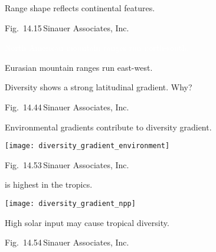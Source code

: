\documentclass[t]{beamer}
\begin{document}
%
{
\begin{frame}[t]{Range shape reflects continental features.}

	\vfilll

	\tiny \hfill Fig.~14.15\,\textcopyright Sinauer Associates, Inc.

\end{frame}
}
%
{
\begin{frame}[t]{\textcolor{white}{North American mountain ranges run north-south.}}

\end{frame}
}
%
{
\begin{frame}[t]{Eurasian mountain ranges run east-west.}

\end{frame}
}
%
{
\begin{frame}[b]{Diversity shows a strong latitudinal gradient. Why?}

	\vfilll
	
	\tiny \hfill Fig.~14.44\,\textcopyright Sinauer Associates, Inc.
\end{frame}
}
%
%
%
%	
%	
%
%
%	
%	
%
\begin{frame}[t]{Environmental gradients contribute to diversity gradient.}
	\begin{center}
		\texttt{[image: diversity\_gradient\_environment]}
	\end{center}
	

	\vfilll

	\tiny \hfill Fig.~14.53\,\textcopyright Sinauer Associates, Inc.

\end{frame}
%
\begin{frame}[t,plain]{ is highest in the tropics.}
	\begin{center}
		\texttt{[image: diversity\_gradient\_npp]}
	\end{center}
\end{frame}
%
{
\begin{frame}[b]{High solar input may cause tropical diversity.}


\vfilll

\tiny \hfill Fig.~14.54\,\textcopyright Sinauer Associates, Inc.

\end{frame}
}
\end{document}

